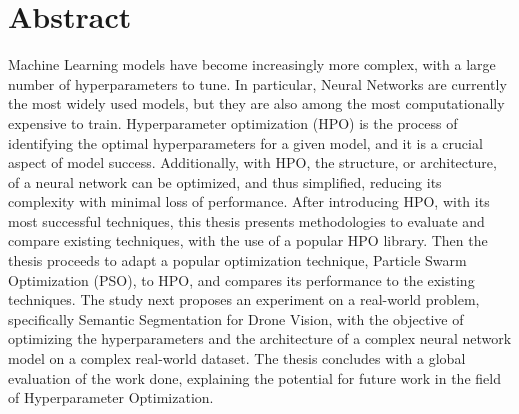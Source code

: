 \chapter*{\Large \center Abstract}

Machine Learning models have become increasingly more complex, with a large number of hyperparameters to tune. In particular, Neural Networks are currently the most widely used models, but they are also among the most computationally expensive to train.
Hyperparameter optimization (HPO) is the process of identifying the optimal hyperparameters for a given model, and it is a crucial aspect of model success. Additionally, with HPO, the structure, or architecture, of a neural network can be optimized, and thus simplified, reducing its complexity with minimal loss of performance.
After introducing HPO, with its most successful techniques, this thesis presents methodologies to evaluate and compare existing techniques, with the use of a popular HPO library.
Then the thesis proceeds to adapt a popular optimization technique, Particle Swarm Optimization (PSO), to HPO, and compares its performance to the existing techniques.
The study next proposes an experiment on a real-world problem, specifically Semantic Segmentation for Drone Vision, with the objective of optimizing the hyperparameters and the architecture of a complex neural network model on a complex real-world dataset.
The thesis concludes with a global evaluation of the work done, explaining the potential for future work in the field of Hyperparameter Optimization.